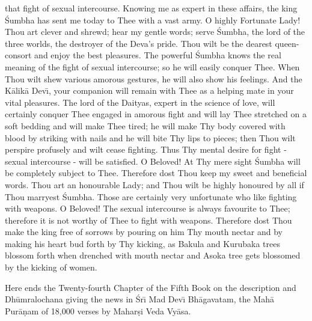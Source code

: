 that fight of sexual intercourse. Knowing me as expert in these affairs, the king \'Sumbha has sent me today to Thee with a vast army. O highly Fortunate Lady! Thou art clever and shrewd; hear my gentle words; serve \'Sumbha, the lord of the three worlds, the destroyer of the Deva's pride. Thou wilt be the dearest queen-consort and enjoy the best pleasures. The powerful \'Sumbha knows the real meaning of the fight of sexual intercourse; so he will easily conquer Thee. When Thou wilt shew various amorous gestures, he will also show his feelings. And the K\=alik\=a Dev\={\i}, your companion will remain with Thee as a helping mate in your vital pleasures. The lord of the Daityas, expert in the science of love, will certainly conquer Thee engaged in amorous fight and will lay Thee stretched on a soft bedding and will make Thee tired; he will make Thy body covered with blood by striking with nails and he will bite Thy lips to pieces; then Thou wilt perspire profusely and wilt cease fighting. Thus Thy mental desire for fight - sexual intercourse - will be satisfied. O Beloved! At Thy mere sight \'Sumbha will be completely subject to Thee. Therefore dost Thou keep my sweet and beneficial words. Thou art an honourable Lady; and Thou wilt be highly honoured by all if Thou marryest \'Sumbha. Those are certainly very unfortunate who like fighting with weapons. O Beloved! The sexual intercourse is always favourite to Thee; therefore it is not worthy of Thee to fight with weapons. Therefore dost Thou make the king free of sorrows by pouring on him Thy mouth nectar and by making his heart bud forth by Thy kicking, as Bakula and Kurubaka trees blossom forth when drenched with mouth nectar and Asoka tree gets blossomed by the kicking of women.

Here ends the Twenty-fourth Chapter of the Fifth Book on the description and Dh\=umralochana giving the news in \'Sr\={\i} Mad Dev\={\i} Bh\=agavatam, the Mah\=a Pur\=a\d{n}am of 18,000 verses by Mahar\d{s}i Veda Vy\=asa.



